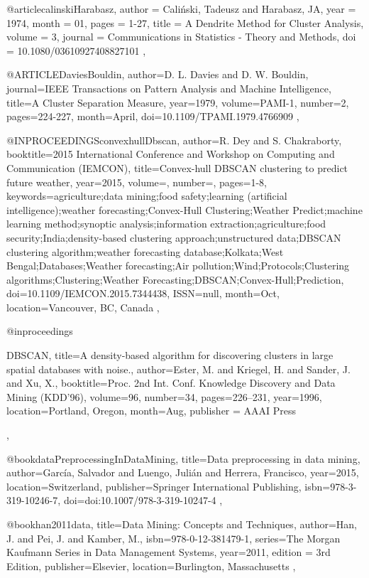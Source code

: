 @article{calinskiHarabasz,
  author = {Caliński, Tadeusz and Harabasz, JA},
  year = {1974},
  month = {01},
  pages = {1-27},
  title = {A Dendrite Method for Cluster Analysis},
  volume = {3},
  journal = {Communications in Statistics - Theory and Methods},
  doi = {10.1080/03610927408827101}
},

@ARTICLE{DaviesBouldin,
  author={D. L. {Davies} and D. W. {Bouldin}},
  journal={IEEE Transactions on Pattern Analysis and Machine Intelligence}, 
  title={A Cluster Separation Measure}, 
  year={1979},
  volume={PAMI-1},
  number={2},
  pages={224-227},
  month={April},
  doi={10.1109/TPAMI.1979.4766909}
},

@INPROCEEDINGS{convexhullDbscan, 
  author={R. {Dey} and S. {Chakraborty}}, 
  booktitle={2015 International Conference and Workshop on Computing and Communication (IEMCON)}, 
  title={Convex-hull DBSCAN clustering to predict future weather}, 
  year={2015}, 
  volume={}, 
  number={}, 
  pages={1-8}, 
  keywords={agriculture;data mining;food safety;learning (artificial intelligence);weather forecasting;Convex-Hull Clustering;Weather Predict;machine learning method;synoptic analysis;information extraction;agriculture;food security;India;density-based clustering approach;unstructured data;DBSCAN clustering algorithm;weather forecasting database;Kolkata;West Bengal;Databases;Weather forecasting;Air pollution;Wind;Protocols;Clustering algorithms;Clustering;Weather Forecasting;DBSCAN;Convex-Hull;Prediction}, 
  doi={10.1109/IEMCON.2015.7344438}, 
  ISSN={null}, 
  month={Oct},
  location={Vancouver, BC, Canada}
},

@inproceedings{DBSCAN,
  title={A density-based algorithm for discovering clusters in large spatial databases with noise.},
  author={Ester, M. and Kriegel, H. and Sander, J. and Xu, X.},
  booktitle={Proc. 2nd Int. Conf. Knowledge Discovery and Data Mining (KDD’96)},
  volume={96},
  number={34},
  pages={226--231},
  year={1996},
  location={Portland, Oregon},
  month={Aug},
  publisher = {AAAI Press}

},

@book{dataPreprocessingInDataMining,
  title={Data preprocessing in data mining},
  author={García, Salvador and Luengo, Julián and Herrera, Francisco},
  year={2015},
  location={Switzerland},
  publisher={Springer International Publishing},
  isbn={978-3-319-10246-7},
  doi={doi:10.1007/978-3-319-10247-4}
},

@book{han2011data,
  title={Data Mining: Concepts and Techniques},
  author={Han, J. and Pei, J. and Kamber, M.},
  isbn={978-0-12-381479-1},
  series={The Morgan Kaufmann Series in Data Management Systems},
  year={2011},
    edition = {3rd Edition},
  publisher={Elsevier},
  location={Burlington, Massachusetts}
},


